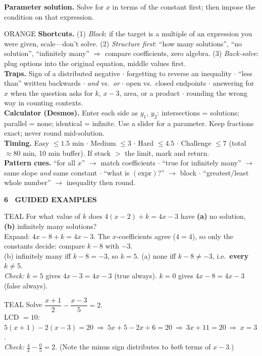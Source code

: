 \documentclass[10pt]{article}
\newcommand{\banner}[1]{\vspace{6pt}\par\noindent\begin{tcolorbox}[enhanced,colback=NAVY,colframe=NAVY,boxrule=0pt,arc=2pt,left=6pt,top=1pt,bottom=1pt,nobeforeafter]\color{white}\bfseries\small\MakeUppercase{#1}\end{tcolorbox}\par\nopagebreak\vspace{2pt}}
\begin{document}
\textbf{Parameter solution.} Solve for $x$ in terms of the constant first; then impose the condition on that expression.
\begin{cbox}[title={5 \textperiodcentered\ Strategy Box}]{ORANGE}
\textbf{Shortcuts.} (1) \emph{Block}: if the target is a multiple of an expression you were given, scale---don't solve. (2) \emph{Structure first}: ``how many solutions'', ``no solution'', ``infinitely many'' $\Rightarrow$ compare coefficients, zero algebra. (3) \emph{Back-solve}: plug options into the original equation, middle values first.\\
\textbf{Traps.} Sign of a distributed negative $\cdot$ forgetting to reverse an inequality $\cdot$ ``less than'' written backwards $\cdot$ \emph{and} vs.\ \emph{or} $\cdot$ open vs.\ closed endpoints $\cdot$ answering for $x$ when the question asks for $k$, $x-3$, area, or a product $\cdot$ rounding the wrong way in counting contexts.\\
\textbf{Calculator (Desmos).} Enter each side as $y_1,\,y_2$: intersections = solutions; parallel = none; identical = infinite. Use a slider for a parameter. Keep fractions exact; never round mid-solution.\\
\textbf{Timing.} Easy $\le1.5$ min $\cdot$ Medium $\le3$ $\cdot$ Hard $\le4.5$ $\cdot$ Challenge $\le7$ (total $\approx80$ min, 10 min buffer). If stuck $>$ the limit, mark and return.\\
\textbf{Pattern cues.} ``for all $x$'' $\to$ match coefficients $\cdot$ ``true for infinitely many'' $\to$ same slope \emph{and} same constant $\cdot$ ``what is $(\text{expr})$?'' $\to$ block $\cdot$ ``greatest/least whole number'' $\to$ inequality then round.\end{cbox}
\banner{6 \textperiodcentered\ Guided Examples}
\begin{cbox}[title={Example 1 \textemdash\ Structure first (parameter)}]{TEAL}
For what value of $k$ does $4(x-2)+k=4x-3$ have \textbf{(a)} no solution, \textbf{(b)} infinitely many solutions?\\[2pt]
Expand: $4x-8+k=4x-3$. The $x$-coefficients agree ($4=4$), so only the constants decide: compare $k-8$ with $-3$.\\
(b) infinitely many iff $k-8=-3$, so $k=5$. (a) none iff $k-8\ne-3$, i.e.\ \textbf{every} $k\ne5$.\\
\emph{Check:} $k=5$ gives $4x-3=4x-3$ (true always). $k=0$ gives $4x-8=4x-3$ (false always).
\end{cbox}
\begin{cbox}[title={Example 2 \textemdash\ Fractions: clear with the LCD}]{TEAL}
Solve $\dfrac{x+1}{2}-\dfrac{x-3}{5}=2$.\\[2pt]
LCD $=10$: $5(x+1)-2(x-3)=20\ \Rightarrow\ 5x+5-2x+6=20\ \Rightarrow\ 3x+11=20\ \Rightarrow\ x=3$.\\
\emph{Check:} $\frac{4}{2}-\frac{0}{5}=2$. \checkmark\quad (Note the minus sign distributes to \emph{both} terms of $x-3$.)
\end{cbox}
\end{document}
